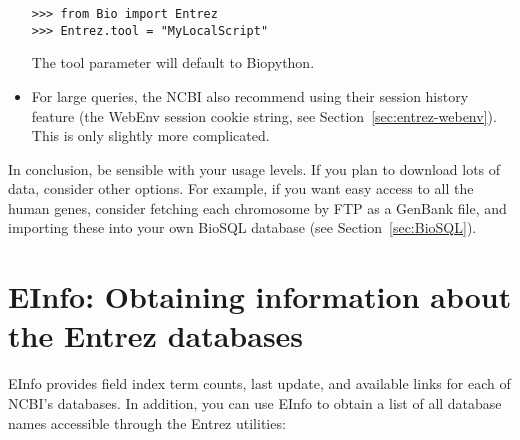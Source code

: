 \begin{itemize}
\begin{verbatim}
>>> from Bio import Entrez
>>> Entrez.tool = "MyLocalScript"
\end{verbatim}
The tool parameter will default to Biopython.
\item For large queries, the NCBI also recommend using their session history feature (the WebEnv session cookie string, see Section~\ref{sec:entrez-webenv}).  This is only slightly more complicated.
\end{itemize}

In conclusion, be sensible with your usage levels.  If you plan to download lots of data, consider other options.  For example, if you want easy access to all the human genes, consider fetching each chromosome by FTP as a GenBank file, and importing these into your own BioSQL database (see Section~\ref{sec:BioSQL}).

\section{EInfo: Obtaining information about the Entrez databases}
\label{sec:entrez-einfo}
EInfo provides field index term counts, last update, and available links for each of NCBI's databases. In addition, you can use EInfo to obtain a list of all database names accessible through the Entrez utilities:

